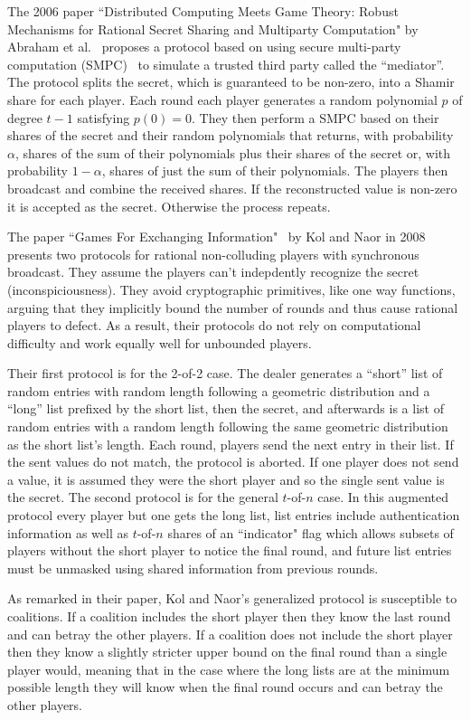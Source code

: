 \documentclass{dalcsthesis}
\begin{document}
The 2006 paper ``Distributed Computing Meets Game Theory: Robust Mechanisms for Rational Secret Sharing and Multiparty Computation" by Abraham et al.~\cite{abraham06} proposes a protocol based on using secure multi-party computation (SMPC)~\cite{Yao82} to simulate a trusted third party called the ``mediator''. The protocol splits the secret, which is guaranteed to be non-zero, into a Shamir share for each player. Each round each player generates a random polynomial $p$ of degree $t-1$ satisfying $p(0) = 0$. They then perform a SMPC based on their shares of the secret and their random polynomials that returns, with probability $\alpha$, shares of the sum of their polynomials plus their shares of the secret or, with probability $1-\alpha$, shares of just the sum of their polynomials. The players then broadcast and combine the received shares. If the reconstructed value is non-zero it is accepted as the secret. Otherwise the process repeats.

The paper ``Games For Exchanging Information"~\cite{kol08} by Kol and Naor in 2008 presents two protocols for rational non-colluding players with synchronous broadcast. They assume the players can't indepdently recognize the secret (inconspiciousness). They avoid cryptographic primitives, like one way functions, arguing that they implicitly bound the number of rounds and thus cause rational players to defect. As a result, their protocols do not rely on computational difficulty and work equally well for unbounded players.

Their first protocol is for the 2-of-2 case. The dealer generates a ``short'' list of random entries with random length following a geometric distribution and a ``long'' list prefixed by the short list, then the secret, and afterwards is a list of random entries with a random length following the same geometric distribution as the short list's length. Each round, players send the next entry in their list. If the sent values do not match, the protocol is aborted. If one player does not send a value, it is assumed they were the short player and so the single sent value is the secret. The second protocol is for the general $t$-of-$n$ case. In this augmented protocol every player but one gets the long list, list entries include authentication information as well as $t$-of-$n$ shares of an ``indicator" flag which allows subsets of players without the short player to notice the final round, and future list entries must be unmasked using shared information from previous rounds.

As remarked in their paper, Kol and Naor's generalized protocol is susceptible to coalitions. If a coalition includes the short player then they know the last round and can betray the other players. If a coalition does not include the short player then they know a slightly stricter upper bound on the final round than a single player would, meaning that in the case where the long lists are at the minimum possible length they will know when the final round occurs and can betray the other players.
\end{document}
